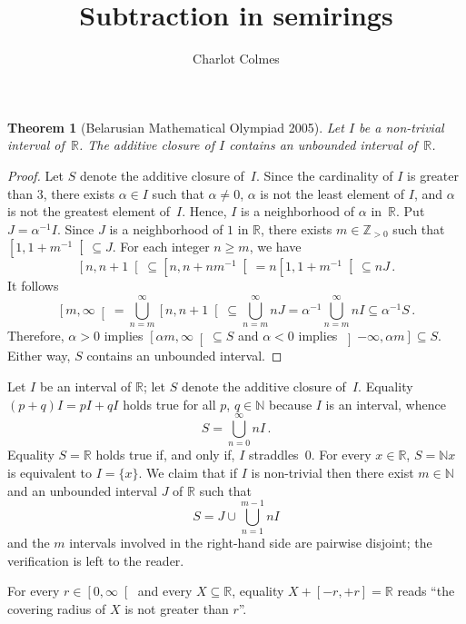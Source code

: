 \documentclass[12pt]{article}
\title{Subtraction in semirings}
\author{Charlot Colmes}
\newcommand{\bZ}{\mathbb{Z}}
\newcommand{\bN}{\mathbb{N}} %
\newcommand{\bNast}{\bZ_{> 0}}
\newcommand{\bR}{\mathbb{R}}
\newcommand{\Rnneg}{\left[0, \infty\right[} %
\newtheorem{theorem}{Theorem}
\theoremstyle{definition}
\begin{document}
\maketitle

\sloppy


 \begin{theorem}[Belarusian Mathematical Olympiad 2005]
   Let $I$ be a non-trivial interval of~$\bR$.
   The additive closure of $I$ contains an unbounded interval of~$\bR$.
\end{theorem}

\begin{proof}
  Let $S$ denote the additive closure of~$I$.
  Since the cardinality of $I$ is greater than $3$,
  there exists $\alpha \in I$ such that $\alpha \ne 0$,
  $\alpha$ is not the least element of $I$, and
  $\alpha$ is not the greatest element of~$I$.
  Hence, $I$ is a neighborhood of $\alpha$ in~$\bR$.
  Put $J = \alpha^{-1} I$.
  Since $J$ is a neighborhood of $1$ in $\bR$, 
  there exists $m \in \bNast$ such that $\left[1, 1 + m^{-1} \right[ \subseteq J$.
  For each integer $n \ge m$,
  we have 
  $$
  \left[n, n + 1 \right[
  \subseteq
  \left[n, n + n m^{-1} \right[
  =
  n \left[1, 1 + m^{-1} \right[
  \subseteq
  n J \, . 
  $$
  It follows
  $$
  \left[m, \infty \right[
   = \bigcup_{n = m}^\infty \left[n, n + 1 \right[
   \subseteq \bigcup_{n = m}^\infty  n J
   = \alpha^{-1} \bigcup_{n = m}^\infty n  I
   \subseteq \alpha^{-1}  S \, .
   $$
   Therefore,
   $\alpha > 0$ implies $\left[\alpha m, \infty \right[ \subseteq S$
   and $\alpha < 0$ implies $\left] - \infty, \alpha m \right] \subseteq S$.
   Either way, $S$ contains an unbounded interval.
 \end{proof}

 Let $I$ be an interval of $\bR$;
 let $S$ denote the additive closure of~$I$.
 Equality $(p + q) I = p I + q I$ holds true for all $p$, $q \in \bN$ because $I$ is an interval, whence 
  $$
  S = \bigcup_{n = 0}^\infty n I \,.
  $$
 Equality $S = \bR$ holds true if, and only if, $I$ straddles~$0$.
 For every $x \in \bR$, $S = \bN x$ is equivalent to $I = \{ x \}$.
 We claim that if $I$ is non-trivial then there exist $m \in \bN$ and an unbounded interval $J$ of $\bR$ such that
 $$
 S = J \cup \bigcup_{n = 1}^{m - 1} n I  
 $$
 and the $m$ intervals involved in the right-hand side are pairwise disjoint;
 the verification is left to the reader.

For every $r \in \Rnneg$ and every $X \subseteq \bR$, equality $X + [- r, + r ] = \bR$ reads ``the covering radius of $X$ is not greater than $r$''.
\end{document}
